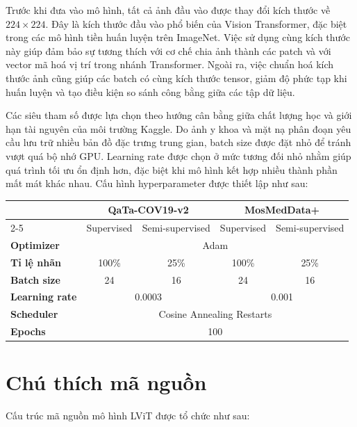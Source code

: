 
Trước khi đưa vào mô hình, tất cả ảnh đầu vào được thay đổi kích thước về $224 \times 224$. Đây là kích thước đầu vào phổ biến của Vision Transformer, đặc biệt trong các mô hình tiền huấn luyện trên ImageNet. Việc sử dụng cùng kích thước này giúp đảm bảo sự tương thích với cơ chế chia ảnh thành các patch và với vector mã hoá vị trí trong nhánh Transformer. Ngoài ra, việc chuẩn hoá kích thước ảnh cũng giúp các batch có cùng kích thước tensor, giảm độ phức tạp khi huấn luyện và tạo điều kiện so sánh công bằng giữa các tập dữ liệu.

Các siêu tham số được lựa chọn theo hướng cân bằng giữa chất lượng học và giới hạn tài nguyên của môi trường Kaggle. Do ảnh y khoa và mặt nạ phân đoạn yêu cầu lưu trữ nhiều bản đồ đặc trưng trung gian, batch size được đặt nhỏ để tránh vượt quá bộ nhớ GPU. Learning rate được chọn ở mức tương đối nhỏ nhằm giúp quá trình tối ưu ổn định hơn, đặc biệt khi mô hình kết hợp nhiều thành phần mất mát khác nhau. Cấu hình hyperparameter được thiết lập như sau:

\begin{table}[H]
    \centering
    \begin{tabular}{lcccc}
    \hline
    \multirow{2}{*}{} & \multicolumn{2}{c}{\textbf{QaTa-COV19-v2}} & \multicolumn{2}{c}{\textbf{MosMedData+}} \\
    \cline{2-5}
    & Supervised & Semi-supervised & Supervised & Semi-supervised \\
    \hline
    \textbf{Optimizer} & \multicolumn{4}{c}{Adam} \\
    \textbf{Tỉ lệ nhãn} & 100\% & 25\% & 100\% & 25\% \\
    \textbf{Batch size} & 24 & 16 & 24 & 16 \\
    \textbf{Learning rate} & \multicolumn{2}{c}{0.0003} & \multicolumn{2}{c}{0.001} \\
    \textbf{Scheduler} & \multicolumn{4}{c}{Cosine Annealing Restarts} \\
    \textbf{Epochs} & \multicolumn{4}{c}{100} \\
    \hline
    \end{tabular}
\end{table}

\section{Chú thích mã nguồn}
Cấu trúc mã nguồn mô hình LViT được tổ chức như sau:

